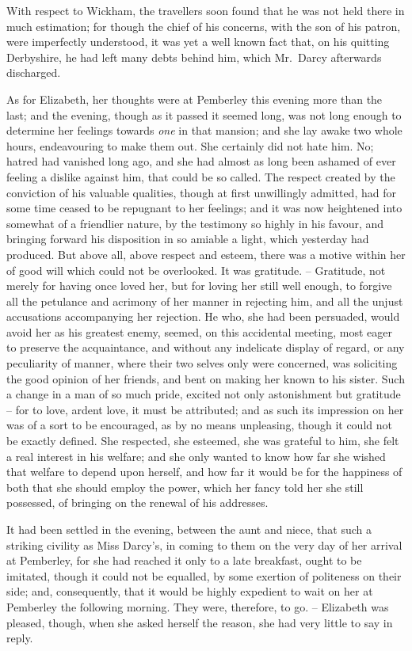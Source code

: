 With respect to Wickham, the travellers soon found that
he was not held there in much estimation; for though
the chief of his concerns, with the son of his patron, were
imperfectly understood, it was yet a well known fact that,
on his quitting Derbyshire, he had left many debts behind
him, which Mr.\ Darcy afterwards discharged.

As for Elizabeth, her thoughts were at Pemberley this
evening more than the last; and the evening, though as
it passed it seemed long, was not long enough to determine
her feelings towards \textit{one} in that mansion; and she
lay awake two whole hours, endeavouring to make them
out. She certainly did not hate him. No; hatred had
vanished long ago, and she had almost as long been
ashamed of ever feeling a dislike against him, that could
be so called. The respect created by the conviction of
his valuable qualities, though at first unwillingly admitted,
had for some time ceased to be repugnant to her feelings;
and it was now heightened into somewhat of a friendlier
nature, by the testimony so highly in his favour, and
bringing forward his disposition in so amiable a light,
which yesterday had produced. But above all, above
respect and esteem, there was a motive within her of
good will which could not be overlooked. It was
gratitude. -- Gratitude, not merely for having once loved her,
but for loving her still well enough, to forgive all the
petulance and acrimony of her manner in rejecting him,
and all the unjust accusations accompanying her rejection.
He who, she had been persuaded, would avoid her as his
greatest enemy, seemed, on this accidental meeting, most
eager to preserve the acquaintance, and without any indelicate
display of regard, or any peculiarity of manner,
where their two selves only were concerned, was soliciting
the good opinion of her friends, and bent on making her
known to his sister. Such a change in a man of so much
pride, excited not only astonishment but gratitude -- for
to love, ardent love, it must be attributed; and as such
its impression on her was of a sort to be encouraged, as
by no means unpleasing, though it could not be exactly
defined. She respected, she esteemed, she was grateful
to him, she felt a real interest in his welfare; and she
only wanted to know how far she wished that welfare to
depend upon herself, and how far it would be for the
happiness of both that she should employ the power,
which her fancy told her she still possessed, of bringing
on the renewal of his addresses.

It had been settled in the evening, between the aunt
and niece, that such a striking civility as Miss Darcy’s,
in coming to them on the very day of her arrival at
Pemberley, for she had reached it only to a late breakfast,
ought to be imitated, though it could not be equalled,
by some exertion of politeness on their side; and, consequently,
that it would be highly expedient to wait on
her at Pemberley the following morning. They were,
therefore, to go. -- Elizabeth was pleased, though, when she
asked herself the reason, she had very little to say in reply.

